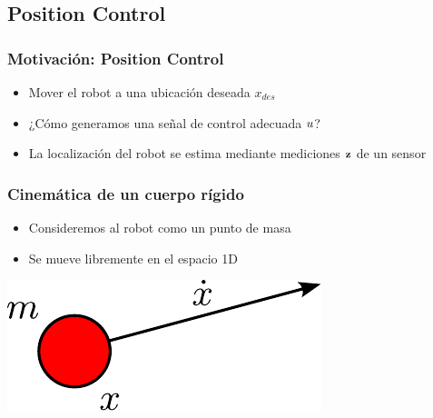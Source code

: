 \subsection{Position Control}

\begin{frame}
    \frametitle{Motivación: Position Control}
    
    \begin{itemize}
        \item Mover el robot a una ubicación deseada $x_{des}$
        \item ¿Cómo generamos una señal de control adecuada $u$?
        \item La localización del robot se estima mediante mediciones $\boldsymbol{\mathbf{z}}$ de un sensor
    \end{itemize}
    
\end{frame}
\begin{frame}
    \frametitle{Cinemática de un cuerpo rígido}
    
    \begin{itemize}
        \item Consideremos al robot como un punto de masa
        \item Se mueve libremente en el espacio 1D
    \end{itemize}
    
    
    \begin{center}
        \includegraphics[width=0.4\columnwidth]{images/rigid_body_kinematics.pdf}
    \end{center}
    
\end{frame}

